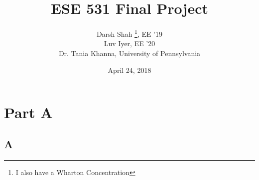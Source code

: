 \documentclass[12pt, letterpaper]{article}
\title{ESE 531 Final Project}
\author{Darsh Shah \thanks{I also have a Wharton Concentration}, EE '19 
\\ Luv Iyer, EE '20 \\ Dr. Tania Khanna, University of Pennsylvania}
\date{April 24, 2018}
\begin{document}
	\maketitle
	
	\newpage
	
	\section{Part A}
	\subsection{A}
\end{document}
